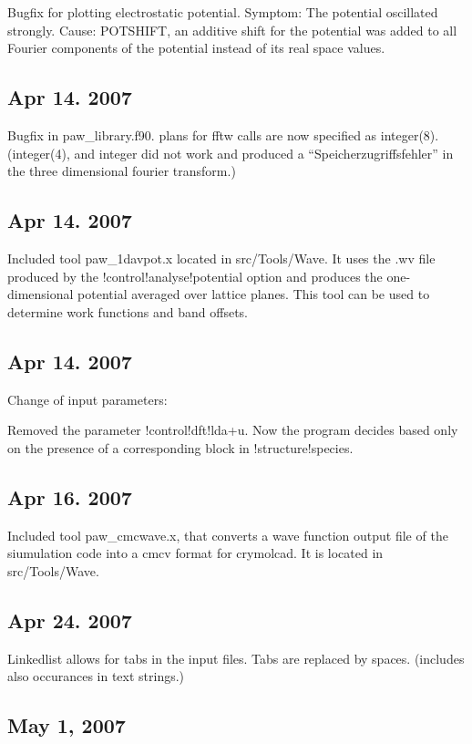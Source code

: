 \documentclass[final,12pt]{article}
\begin{document}
Bugfix for plotting electrostatic potential. Symptom: The potential oscillated strongly.
Cause: POTSHIFT, an additive shift for the potential was added to all Fourier components 
of the potential instead of its real space values.

\subsection{Apr 14. 2007}

Bugfix in paw\_library.f90. plans for fftw calls are now specified as integer(8). 
(integer(4), and integer did not work and produced a ``Speicherzugriffsfehler'' in the
 three dimensional fourier transform.)

\subsection{Apr 14. 2007}

Included tool paw\_1davpot.x located in src/Tools/Wave. It uses the .wv
file produced by the !control!analyse!potential option and produces
the one-dimensional potential averaged over lattice planes. This tool
can be used to determine work functions and band offsets.

\subsection{Apr 14. 2007}

Change of input parameters: 

Removed the parameter !control!dft!lda+u. Now the program decides
based only on the presence of a corresponding block in
!structure!species.

\subsection{Apr 16. 2007}

Included tool paw\_cmcwave.x, that converts a wave function output file
of the siumulation code into a cmcv format for crymolcad. It is
located in src/Tools/Wave.

\subsection{Apr 24. 2007}

Linkedlist allows for tabs in the input files. Tabs are replaced by
spaces. (includes also occurances in text strings.) 

\subsection{May 1,  2007}
\end{document}
